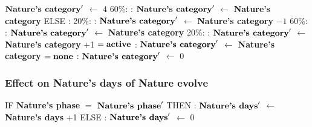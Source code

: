 \documentclass{article}%
\begin{document}
\begin{flushleft}
$\mbox{\textbf{Nature's category}} '$%
$\leftarrow$%
4%
\linebreak%
\hspace*{10em}%
60\%:%
: %
$\mbox{\textbf{Nature's category}} '$%
$\leftarrow$%
\textbf{Nature's category}%
\linebreak%
\hspace*{8em}%
ELSE %
: %
\linebreak%
\hspace*{10em}%
20\%:%
: %
$\mbox{\textbf{Nature's category}} '$%
$\leftarrow$%
\textbf{Nature's category}%
${-}1$%
\linebreak%
\hspace*{10em}%
60\%:%
: %
$\mbox{\textbf{Nature's category}} '$%
$\leftarrow$%
\textbf{Nature's category}%
\linebreak%
\hspace*{10em}%
20\%:%
: %
$\mbox{\textbf{Nature's category}} '$%
$\leftarrow$%
\textbf{Nature's category}%
+1%
\linebreak%
\hspace*{2em}%
$= \mbox{\textbf{active}}$%
: %
$\mbox{\textbf{Nature's category}} '$%
$\leftarrow$%
\textbf{Nature's category}%
\linebreak%
\hspace*{2em}%
$= \mbox{\textbf{none}}$%
: %
$\mbox{\textbf{Nature's category}} '$%
$\leftarrow$%
0%
\end{flushleft}

%
\subsubsection{Effect on Nature's days of Nature evolve}%
\label{ssubsec:Effect on Nature's days of Nature evolve}%
\begin{flushleft}%
IF %
\textbf{Nature's phase}%
$=$%
$\mbox{\textbf{Nature's phase}} '$%
\linebreak%
\hspace*{2em}%
THEN %
: %
$\mbox{\textbf{Nature's days}} '$%
$\leftarrow$%
\textbf{Nature's days}%
+1%
\linebreak%
\hspace*{2em}%
ELSE %
: %
$\mbox{\textbf{Nature's days}} '$%
$\leftarrow$%
0%
\end{flushleft}

%
\end{document}
